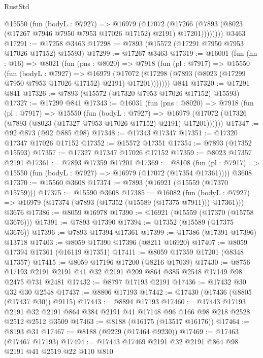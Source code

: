 \begin{lexlean}{RustStd}
\begin{coremodule}
          @15550
            (fun (bodyL : @7927) =>
            @16979
              (@17072
                (@17266 (@7893 (@8023 (@17267 @7946 @7950 @7953 @17026 @17152) @2191) @17201))))))))
    @3463
@17291 := @17258 @3463
@17298 := @7893 (@15572 (@17291 @7950 @7953 @17026 @17152) @15593)
@17299 := @17267 @3463
@17319 := @16001
    (fun (hn : @16) =>
    @8021
      (fun (pns : @8020) =>
      @7918
        (fun (pl : @7917) =>
        @15550
          (fun (bodyL : @7927) =>
          @16979
            (@17072 (@17298 (@7893 (@8023 (@17299 @7950 @7953 @17026 @17152) @2191) @17201)))))))
    @841
@17320 := @17291 @841
@17326 := @7893 (@15572 (@17320 @7953 @17026 @17152) @15593)
@17327 := @17299 @841
@17343 := @16031
    (fun (pns : @8020) =>
    @7918
      (fun (pl : @7917) =>
      @15550
        (fun (bodyL : @7927) =>
        @16979 (@17072 (@17326 (@7893 (@8023 (@17327 @7953 @17026 @17152) @2191) @17201))))))
@17347 := @92 @873 (@92 @885 @98)
@17348 := @17343 @17347
@17351 := @17320 @17347 @17026 @17152
@17352 := @15572 @17351
@17354 := @7893 (@17352 @15593)
@17357 := @17327 @17347 @17026 @17152
@17359 := @8023 @17357 @2191
@17361 := @7893 @17359 @17201
@17369 := @8108
    (fun (pl : @7917) => @15550 (fun (bodyL : @7927) => @16979 (@17072 (@17354 @17361))))
    @3608
@17370 := @15560 @3608
@17374 := @7893 (@16921 (@15559 (@17370 @15759)))
@17375 := @15590 @3608
@17385 := @16082
    (fun (bodyL : @7927) => @16979 (@17374 (@7893 (@17352 (@15589 (@17375 @7911))) @17361)))
    @3676
@17386 := @8059 @16978
@17390 := @16921 (@15559 (@17370 (@15758 @3676)))
@17391 := @7893 @17390
@17394 := @17352 (@15589 (@17375 @3676))
@17396 := @7893 @17394 @17361
@17399 := @17386 (@17391 @17396) @13718
@17403 := @8059 @17390 @17396 (@8211 @16920)
@17407 := @8059 @17394 @17361 (@16119 @17351)
@17411 := @8059 @17359 @17201 (@8348 @17357)
@17415 := @8059 @17196 @17200 (@8216 @17039)
@17430 := @8756 @17193 @2191 @2191 @41 @32 @2191 @209 @864 @385 @2548 @17149 @98 @2475 @731 @2481
@17432 := @8797 @17193 @2191
@17436 := @17432 @30 @32 @30 @2548
@17437 := @8806 @17193
@17442 := @17430 (@17436 (@8805 (@17437 @30)) @9115)
@17443 := @8894 @17193
@17460 := @17443
    @17193
    @2191
    @32
    @2191
    @864
    @384
    @2191
    @41
    @17148
    @96
    @166
    @98
    @218
    @2528
    @2512
    @2512
    @3509
@17463 := @8188 (@16175 (@13517 @16176))
@17464 := @8193 @31
@17467 := @8188 (@9229 (@17464 @9230))
@17469 := @17463 (@17467 @17193)
@17494 := @17443
    @17469
    @2191
    @32
    @2191
    @864
    @98
    @2191
    @41
    @2519
    @22
    @110
    @810

\end{coremodule}
\end{lexlean}

